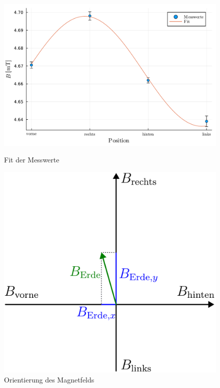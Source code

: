 \documentclass[12pt,a4paper]{scrartcl}
\numberwithin{equation}{section} %
\begin{document}
\begin{figure}[h!]
	\centering
	\begin{minipage}[t]{0.6\textwidth}
		\includegraphics[width=\textwidth]{../media/B1.5/Erdmagnetfeld_Fit.pdf}
		\caption{Fit der Messwerte}
		\label{fig:Erdmagnetfeld Fit}
	\end{minipage}
	\begin{minipage}[t]{0.39\textwidth}
		\includegraphics[width=\textwidth]{../media/B1.5/Erdmagnetfeld.pdf}
		\caption{Orientierung des Magnetfelds}
		\label{abb:Erdmagnetfeld Orientierung}
	\end{minipage}
\end{figure}
\end{document}
